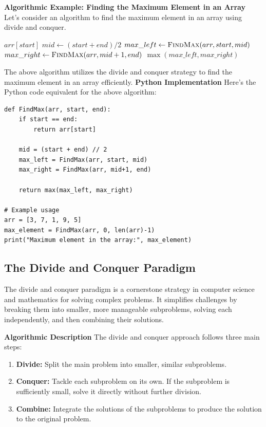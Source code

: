 \documentclass[12pt]{book} %
\begin{document}
\textbf{Algorithmic Example: Finding the Maximum Element in an Array}
Let's consider an algorithm to find the maximum element in an array using divide and conquer.
\FloatBarrier
\begin{algorithm}
\caption{Find Maximum Element}\label{max_element}
\begin{algorithmic}[1]
        \State \Return $arr[start]$
    \EndIf
    \State $mid \gets (start + end) / 2$
    \State $max\_left \gets \Call{FindMax}{arr, start, mid}$
    \State $max\_right \gets \Call{FindMax}{arr, mid+1, end}$
    \State \Return $\max(max\_left, max\_right)$
\EndFunction
\end{algorithmic}
\end{algorithm}
\FloatBarrier
The above algorithm utilizes the divide and conquer strategy to find the maximum element in an array efficiently.
\FloatBarrier
\textbf{Python Implementation}
Here's the Python code equivalent for the above algorithm:
\FloatBarrier
\begin{lstlisting}
def FindMax(arr, start, end):
    if start == end:
        return arr[start]
    
    mid = (start + end) // 2
    max_left = FindMax(arr, start, mid)
    max_right = FindMax(arr, mid+1, end)
    
    return max(max_left, max_right)

# Example usage
arr = [3, 7, 1, 9, 5]
max_element = FindMax(arr, 0, len(arr)-1)
print("Maximum element in the array:", max_element)
\end{lstlisting}

\subsection{The Divide and Conquer Paradigm}

The divide and conquer paradigm is a cornerstone strategy in computer science and mathematics for solving complex problems. It simplifies challenges by breaking them into smaller, more manageable subproblems, solving each independently, and then combining their solutions.

\textbf{Algorithmic Description}
The divide and conquer approach follows three main steps:
\begin{enumerate}
    \item \textbf{Divide:} Split the main problem into smaller, similar subproblems.
    \item \textbf{Conquer:} Tackle each subproblem on its own. If the subproblem is sufficiently small, solve it directly without further division.
    \item \textbf{Combine:} Integrate the solutions of the subproblems to produce the solution to the original problem.
\end{enumerate}
\end{document}
